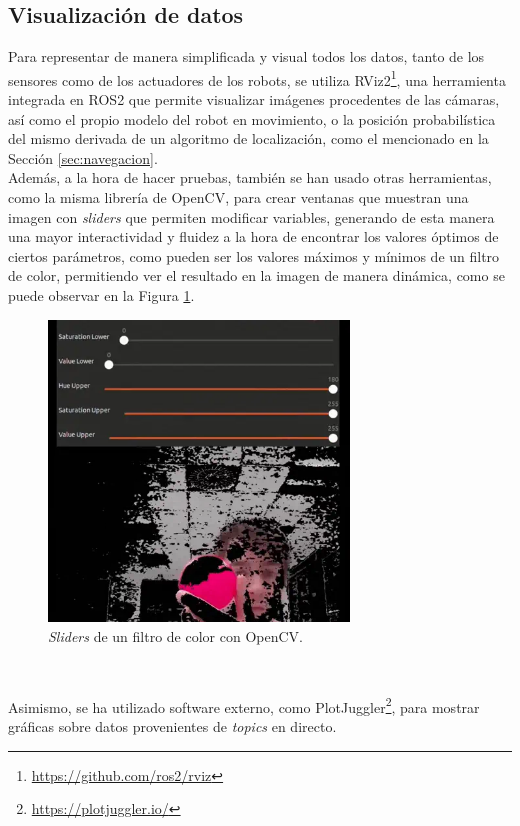 \subsection{Visualización de datos}
\label{sec:visualizacion_datos}

Para representar de manera simplificada y visual todos los datos, tanto de los
sensores como de los actuadores de los robots, se utiliza
RViz2\footnote{\url{https://github.com/ros2/rviz}}, una herramienta integrada en
ROS2 que permite visualizar imágenes procedentes de las cámaras, así como el
propio modelo del robot en movimiento, o la posición probabilística del mismo
derivada de un algoritmo de localización, como el mencionado en la Sección
\ref{sec:navegacion}.
\\

Además, a la hora de hacer pruebas, también se han usado otras herramientas, como
la misma librería de OpenCV, para crear ventanas que muestran una imagen con
\textit{sliders} que permiten modificar variables, generando de esta manera una
mayor interactividad y fluidez a la hora de encontrar los valores óptimos de
ciertos parámetros, como pueden ser los valores máximos y mínimos de un filtro
de color, permitiendo ver el resultado en la imagen de manera dinámica, como se
puede observar en la Figura \ref{fig:opencv}.
\\

\begin{figure} [h!]
  \begin{center}
    \includegraphics[width=8cm]{figs/opencv_visualization}
  \end{center}
  \caption{\textit{Sliders} de un filtro de color con OpenCV.}
  \label{fig:opencv}
\end{figure}\

Asimismo, se ha utilizado software externo, como
PlotJuggler\footnote{\url{https://plotjuggler.io/}}, para mostrar gráficas sobre
datos provenientes de \textit{topics} en directo.


